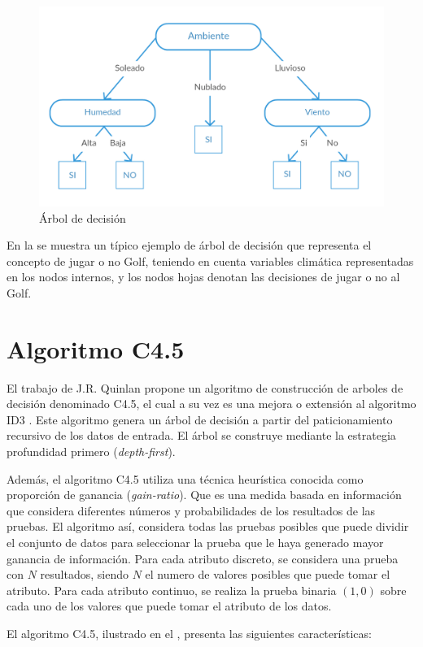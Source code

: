 \begin{figure}[!htbp]
	\centering
	\includegraphics[width=0.7\linewidth]{capitulo-3/graphics/ad_2}
	\caption[Ejemplo de árbol de decisión]{\label{fig:arbolEjemplo}Árbol de decisión}
\end{figure}

En la  se muestra un típico ejemplo de árbol de decisión que representa el concepto de jugar o no Golf, teniendo en cuenta variables climática representadas en los nodos internos, y los nodos hojas denotan las decisiones de jugar o no al Golf. 

\section{Algoritmo C4.5}
El trabajo de J.R. Quinlan \cite{Quinlan:1993:CPM:152181} propone un algoritmo de construcción de arboles de decisión denominado C4.5, el cual a su vez es una mejora o extensión al algoritmo ID3 \cite{Quinlan:1986:IDT:637962.637969}. Este algoritmo genera un árbol de decisión a partir del paticionamiento recursivo de los datos de entrada. El árbol se construye mediante la estrategia profundidad primero (\emph{depth-first}).

Además, el algoritmo C4.5 utiliza una técnica heurística conocida como proporción de ganancia (\emph{gain-ratio}). Que es una medida basada en información que considera diferentes números y probabilidades de los resultados de las pruebas. El algoritmo así, considera todas las pruebas posibles que puede dividir el conjunto de datos para seleccionar la prueba que le haya generado mayor ganancia de información. Para cada atributo discreto, se considera una prueba con $N$ resultados, siendo $N$ el numero de valores posibles que puede tomar el atributo. Para cada atributo continuo, se realiza la prueba binaria $(1, 0)$ sobre cada uno de los valores que puede tomar el atributo de los datos. 

El algoritmo C4.5, ilustrado en el , presenta las siguientes características:

